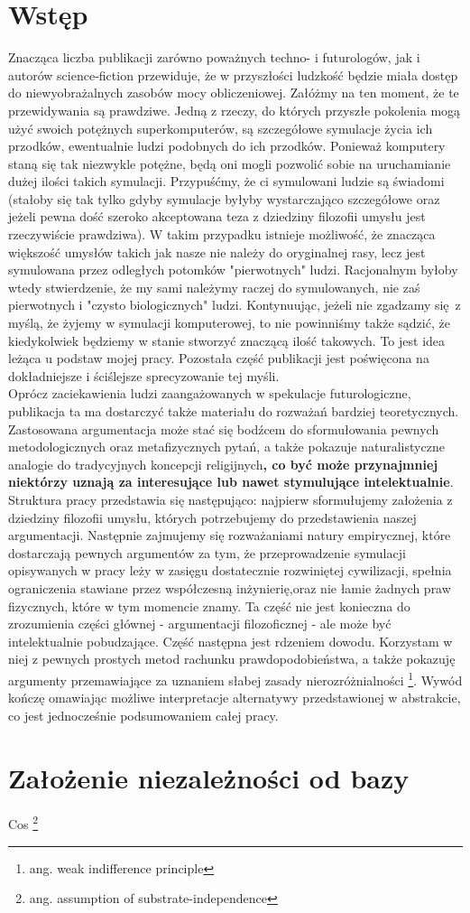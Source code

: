 \documentclass[12pt]{article}
\begin{document}
	\section{Wstęp}
		Znacząca liczba publikacji zarówno poważnych techno- i futurologów, jak i autorów science-fiction przewiduje, że w przyszłości ludzkość będzie miała dostęp do niewyobrażalnych zasobów mocy obliczeniowej. Załóżmy na ten moment, że te przewidywania są prawdziwe. Jedną z rzeczy, do których przyszłe pokolenia mogą użyć swoich potężnych superkomputerów, są szczegółowe symulacje życia ich przodków, ewentualnie ludzi podobnych do ich przodków. Ponieważ komputery staną się tak niezwykle potężne, będą oni mogli pozwolić sobie na uruchamianie dużej ilości takich symulacji. Przypuśćmy, że ci symulowani ludzie są świadomi (stałoby się tak tylko gdyby symulacje byłyby wystarczająco szczegółowe oraz jeżeli pewna dość szeroko akceptowana teza z dziedziny filozofii umysłu jest rzeczywiście prawdziwa). W takim przypadku istnieje możliwość, że znacząca większość umysłów takich jak nasze nie należy do oryginalnej rasy, lecz jest symulowana przez odległych potomków "pierwotnych" ludzi. Racjonalnym byłoby wtedy stwierdzenie, że my sami należymy raczej do symulowanych, nie zaś pierwotnych i "czysto biologicznych" ludzi. Kontynuując, jeżeli nie zgadzamy się z myślą, że żyjemy w symulacji komputerowej, to nie powinniśmy także sądzić, że kiedykolwiek będziemy w stanie stworzyć znaczącą ilość takowych. To jest idea leżąca u podstaw mojej pracy. Pozostała część publikacji jest poświęcona na dokładniejsze i ściślejsze sprecyzowanie tej myśli. \\
		Oprócz zaciekawienia ludzi zaangażowanych w spekulacje futurologiczne, publikacja ta ma dostarczyć także materiału do rozważań bardziej teoretycznych. Zastosowana argumentacja może stać się bodźcem do sformułowania pewnych metodologicznych oraz metafizycznych pytań, a także pokazuje naturalistyczne analogie do tradycyjnych koncepcji religijnych\textbf{, co być może przynajmniej niektórzy uznają za interesujące lub nawet stymulujące intelektualnie}.\\
		Struktura pracy przedstawia się następująco: najpierw sformułujemy założenia z dziedziny filozofii umysłu, których potrzebujemy do przedstawienia naszej argumentacji. Następnie zajmujemy się rozważaniami natury empirycznej, które dostarczają pewnych argumentów za tym, że przeprowadzenie symulacji opisywanych w pracy leży w zasięgu dostatecznie rozwiniętej cywilizacji, spełnia ograniczenia stawiane przez współczesną inżynierię,oraz nie łamie żadnych praw fizycznych, które w tym momencie znamy. Ta część nie jest konieczna do zrozumienia części głównej - argumentacji filozoficznej - ale może być intelektualnie pobudzające.
		Część następna jest rdzeniem dowodu. Korzystam w niej z pewnych prostych metod rachunku prawdopodobieństwa, a także pokazuję argumenty przemawiające za uznaniem słabej zasady nierozróżnialności \footnote{ang. weak indifference principle}. Wywód kończę omawiając możliwe interpretacje alternatywy przedstawionej w abstrakcie, co jest jednocześnie podsumowaniem całej pracy.
	\section{Założenie niezależności od bazy} 
		Cos \footnote{ang. assumption of substrate-independence}
\end{document}
